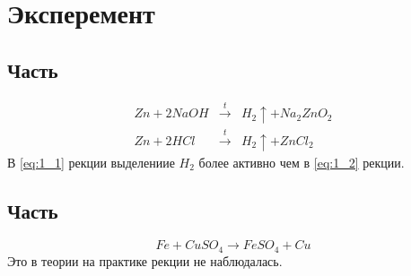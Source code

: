 \section{Эксперемент}

\subsection{Часть}

\begin{eqnarray} 
  Zn + 2NaOH &\xrightarrow{t}& H_2\uparrow + Na_2ZnO_2 
  \label{eq:1_1}\\
  Zn + 2HCl &\xrightarrow{t}& H_2\uparrow + ZnCl_2 
  \label{eq:1_2}
\end{eqnarray} 
В \ref{eq:1_1}{ рекции} выделениие $H_2$ более активно чем в
\ref{eq:1_2}{ рекции}.


\subsection{Часть}
\begin{equation} 
 Fe + CuSO_4 \xrightarrow{} FeSO_4 + Cu
\end{equation} 
Это в теории на практике рекции не наблюдалась.